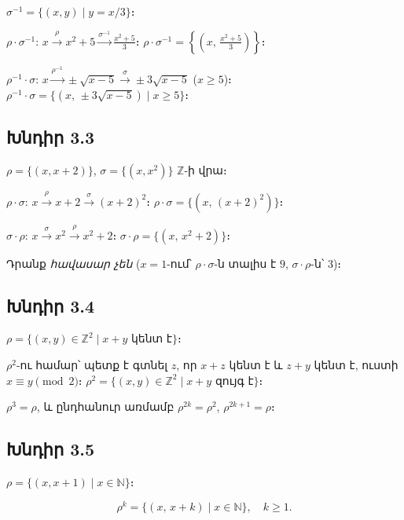 $\boxed{\sigma^{-1}=\{(x,y)\mid y=x/3\}}$։

$\rho\cdot\sigma^{-1}$: $x\xrightarrow{\rho}x^2+5\xrightarrow{\sigma^{-1}}\tfrac{x^2+5}{3}$։ \;$\boxed{\rho\cdot\sigma^{-1}=\left\{\left(x,\,\tfrac{x^2+5}{3}\right)\right\}}$։

$\rho^{-1}\cdot\sigma$: $x\xrightarrow{\rho^{-1}}\pm\sqrt{x-5}\xrightarrow{\sigma}\pm 3\sqrt{x-5}$ \;($x\ge 5$)։ \;$\boxed{\rho^{-1}\cdot\sigma=\{(x,\,\pm 3\sqrt{x-5})\mid x\ge 5\}}$։


\subsection*{Խնդիր 3.3}

$\rho=\{(x,x+2)\}$, $\sigma=\{(x,x^2)\}$ $\mathbb{Z}$-ի վրա։

$\rho\cdot\sigma$: $x\xrightarrow{\rho}x+2\xrightarrow{\sigma}(x+2)^2$։ \;$\boxed{\rho\cdot\sigma=\{(x,\,(x+2)^2)\}}$։

$\sigma\cdot\rho$: $x\xrightarrow{\sigma}x^2\xrightarrow{\rho}x^2+2$։ \;$\boxed{\sigma\cdot\rho=\{(x,\,x^2+2)\}}$։

Դրանք \emph{հավասար չեն} ($x=1$-ում՝ $\rho\cdot\sigma$-ն տալիս է $9$, $\sigma\cdot\rho$-ն՝ $3$)։


\subsection*{Խնդիր 3.4}

$\rho=\{(x,y)\in\mathbb{Z}^2\mid x+y \text{ կենտ է}\}$։

$\rho^2$-ու համար՝ պետք է գտնել $z$, որ $x+z$ կենտ է և $z+y$ կենտ է, ուստի $x\equiv y\pmod{2}$։
$\boxed{\rho^2=\{(x,y)\in\mathbb{Z}^2\mid x+y \text{ զույգ է}\}}$։

$\boxed{\rho^3=\rho}$, և ընդհանուր առմամբ $\rho^{2k}=\rho^2$, $\rho^{2k+1}=\rho$։


\subsection*{Խնդիր 3.5}

$\rho=\{(x,x+1)\mid x\in\mathbb{N}\}$։

\[\boxed{\rho^k=\{(x,\,x+k)\mid x\in\mathbb{N}\},\quad k\ge 1.}\]

